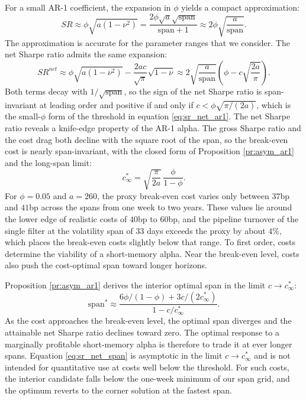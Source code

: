 \documentclass[hidelinks]{siamonline250211}
\newcommand{\spn}{\mathrm{span}}
\begin{document}
For a small AR-1 coefficient, the expansion in $\phi$ yields a compact approximation:
\begin{equation} \label{eq:sr_ar1_approx}
	SR \approx \phi \sqrt{a \left(1-\nu^{2}\right)} = \frac{2\phi\sqrt{a}\sqrt{\spn}}{\spn+1} \approx 2\phi\sqrt{\frac{a}{\spn}}.
\end{equation}
The approximation is accurate for the parameter ranges that we consider. The net Sharpe ratio admits the same expansion:
\begin{equation} \label{eq:sr_net_ar1_approx}
	SR^{net} \approx \phi \sqrt{a\left(1-\nu^{2}\right)} - \frac{2ac}{\sqrt{\pi}}\sqrt{1-\nu} \approx 2\sqrt{\frac{a}{\spn}} \left( \phi - c\sqrt{\frac{2a}{\pi}} \right).
\end{equation}
Both terms decay with $1/\sqrt{\spn}$, so the sign of the net Sharpe ratio is span-invariant at leading order and positive if and only if $c < \phi\sqrt{\pi/(2a)}$, which is the small-$\phi$ form of the threshold in equation \eqref{eq:sr_net_ar1}. The net Sharpe ratio reveals a knife-edge property of the AR-1 alpha. The gross Sharpe ratio and the cost drag both decline with the square root of the span, so the break-even cost is nearly span-invariant, with the closed form of Proposition \ref{pr:asym_ar1} and the long-span limit:
\begin{equation} \label{eq:sr_net_ar1}
	c^{*}_{\infty} = \sqrt{\frac{\pi}{2a}}\,\frac{\phi}{1-\phi}.
\end{equation}
For $\phi=0.05$ and $a=260$, the proxy break-even cost varies only between $37$bp and $41$bp across the spans from one week to two years. These values lie around the lower edge of realistic costs of $40$bp to $60$bp, and the pipeline turnover of the single filter at the volatility span of $33$ days exceeds the proxy by about $4\%$, which places the break-even costs slightly below that range. To first order, costs determine the viability of a short-memory alpha. Near the break-even level, costs also push the cost-optimal span toward longer horizons.

Proposition \ref{pr:asym_ar1} derives the interior optimal span in the limit $c \to c^{*}_{\infty}$:
\begin{equation} \label{eq:sr_net_span}
	\spn^{*} \approx \frac{6\phi/(1-\phi) + 3c/(2c^{*}_{\infty})}{1 - c/c^{*}_{\infty}}.
\end{equation}
As the cost approaches the break-even level, the optimal span diverges and the attainable net Sharpe ratio declines toward zero. The optimal response to a marginally profitable short-memory alpha is therefore to trade it at ever longer spans. Equation \eqref{eq:sr_net_span} is asymptotic in the limit $c \to c^{*}_{\infty}$ and is not intended for quantitative use at costs well below the threshold. For such costs, the interior candidate falls below the one-week minimum of our span grid, and the optimum reverts to the corner solution at the fastest span.
\end{document}
